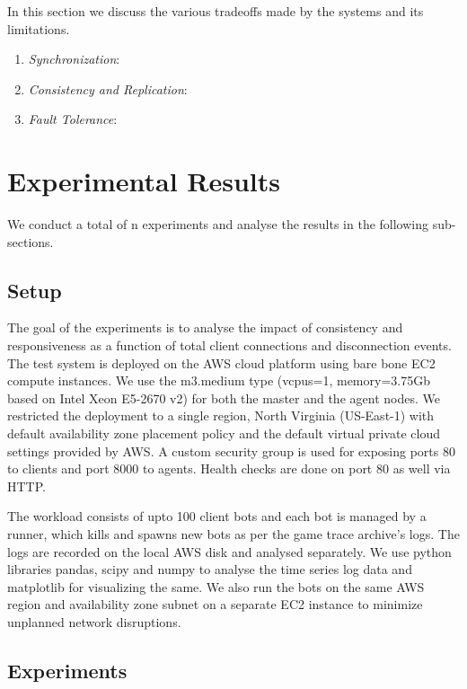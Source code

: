 \documentclass[a4paper]{IEEEtran}
\begin{document}
  In this section we discuss the various tradeoffs made by the systems and its limitations.
  
  \begin{enumerate}
    \item \emph{Synchronization}: 

    \item \emph{Consistency and Replication}: 
  
    \item \emph{Fault Tolerance}: 
  \end{enumerate}
  
  \section{Experimental Results} \label{experiments}
  
  We conduct a total of n experiments and analyse the results in the following sub-sections.
  
  \subsection{Setup}
  
  The goal of the experiments is to analyse the impact of consistency and responsiveness as a function of total client connections and disconnection events. The test system is deployed on the AWS cloud platform using bare bone EC2 compute instances. We use the m3.medium type (vcpus=1, memory=3.75Gb based on Intel Xeon E5-2670 v2) for both the master and the agent nodes. We restricted the deployment to a single region, North Virginia (US-East-1) with default availability zone placement policy and the default virtual private cloud settings provided by AWS. A custom security group is used for exposing ports 80 to clients and port 8000 to agents. Health checks are done on port 80 as well via HTTP.
  
  The workload consists of upto 100 client bots and each bot is managed by a runner, which kills and spawns new bots as per the game trace archive's logs. The logs are recorded on the local AWS disk and analysed separately.
  We use python libraries pandas, scipy and numpy to analyse the time series log data and matplotlib for visualizing the same. We also run the bots on the same AWS region and availability zone subnet on a separate EC2 instance to minimize unplanned network disruptions.
  
  \subsection{Experiments}
  
\end{document}
